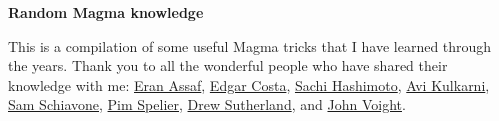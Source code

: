 \documentclass[12pt]{article}
\begin{document}
\begin{center}
\begin{Large}
    \textbf{Random \textsf{Magma} knowledge}\\
\end{Large}
\end{center}

This is a compilation of some useful \textsf{Magma} tricks that I have learned through the years. Thank you to all the wonderful people who have shared their knowledge with me:
\href{https://math.dartmouth.edu/~eassaf/}{Eran Assaf},
\href{https://math.mit.edu/~edgarc/}{Edgar Costa},
\href{https://sachihashimoto.github.io}{Sachi Hashimoto},
\href{https://math.dartmouth.edu/~akulkarn/}{Avi Kulkarni},
\href{https://math.mit.edu/~sschiavo/}{Sam Schiavone},
\href{https://sites.google.com/view/pim-spelier/home}{Pim Spelier},
\href{https://math.mit.edu/~drew/}{Drew Sutherland}, and
\href{https://math.dartmouth.edu/~jvoight}{John Voight}.
\end{document}
